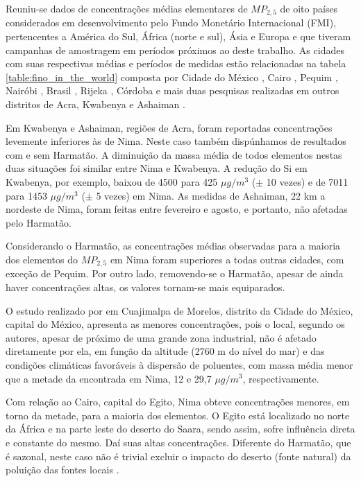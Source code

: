 Reuniu-se dados de concentrações médias elementares de $MP_{2,5}$ de oito 
países considerados em desenvolvimento pelo Fundo Monetário Internacional (FMI),
pertencentes a América do Sul, África (norte e sul), Ásia e Europa e que tiveram
campanhas de amostragem em períodos próximos ao deste trabalho. As cidades
com suas respectivas médias e períodos de medidas estão relacionadas na 
tabela \ref{table:fino_in_the_world} composta por  
Cidade do México \citep{diaz2014},
Cairo  \citep{boman2013},
Pequim  \citep{yang2011},
Nairóbi   \citep{gaita2014},
Brasil \citep{andrade2012urban},
Rijeka  \citep{ivovsevic2015}, 
Córdoba  \citep{achad2014} e mais duas pesquisas realizadas em 
outros distritos de Acra, Kwabenya \citep{aboh2009} e Ashaiman \citep{ofosu2012}. 

Em Kwabenya e Ashaiman, regiões de Acra, foram reportadas concentrações 
levemente inferiores às de Nima. Neste caso também dispúnhamos de resultados 
com e sem Harmatão. A diminuição da massa média de todos elementos nestas duas 
situações foi similar entre Nima e Kwabenya. A redução do Si em Kwabenya, 
por exemplo, baixou de 4500 para 425 $\mu g/m^3$ 
($\pm$ 10 vezes) e de 7011 para 1453 $\mu g/m^3$ ($\pm$ 5 vezes) em Nima. 
As medidas de Ashaiman, 22 km a nordeste de Nima, foram feitas entre 
fevereiro e agosto, e portanto, não afetadas pelo Harmatão.

Considerando o Harmatão, as concentrações médias observadas para a maioria dos 
elementos do $MP_{2,5}$ em Nima foram superiores a todas outras cidades, com 
exceção de Pequim. Por outro lado, removendo-se o Harmatão, apesar de ainda 
haver concentrações altas, os valores tornam-se mais equiparados. 

O estudo realizado por \citet{diaz2014} em Cuajimalpa de Morelos, distrito 
da Cidade do México, capital do México, apresenta as menores concentrações, 
pois o local, segundo os autores, apesar de próximo de uma grande zona industrial, 
não é afetado diretamente por ela, em função da altitude (2760 m do nível do mar)
e das condições climáticas favoráveis à dispersão de poluentes, com massa média 
menor que a metade da encontrada em Nima, 12 e 29,7 $\mu g/m^3$, respectivamente.

Com relação ao Cairo, capital do Egito, Nima obteve concentrações menores, 
em torno da metade, para a maioria dos elementos. O Egito está localizado 
no norte da África e na parte leste do deserto do Saara, sendo assim,
sofre influência direta e constante do mesmo. Daí suas altas concentrações. 
Diferente do Harmatão, que é sazonal, neste caso não é trivial excluir o impacto 
do deserto (fonte natural) da poluição das fontes locais \citet{boman2013}.

